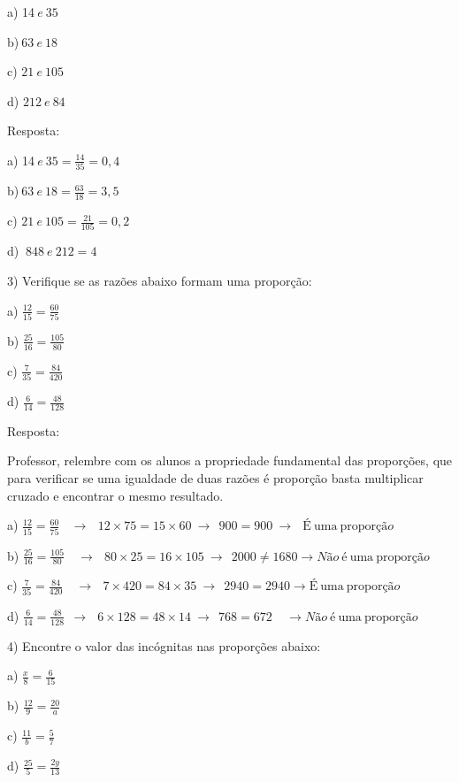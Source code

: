 a) 14\(\ e\ 35\)

b)\(\ 63\ e\ 18\)

c) \(21\ e\ 105\)

d) \(212\ e\ 84\)

Resposta:

a) 14\(\ e\ 35 = \frac{14}{35} = 0,4\)

b)\(\ 63\ e\ 18 = \frac{63}{18} = 3,5\)

c) \(21\ e\ 105 = \frac{21}{105} = 0,2\)

d) \(\ 848\ e\ 212 = 4\)

3) Verifique se as razões abaixo formam uma proporção:

a) \(\frac{12}{15} = \frac{60}{75}\)

b) \(\frac{25}{16} = \frac{105}{80}\)

c) \(\frac{7}{35} = \frac{84}{420}\)

d) \(\frac{6}{14} = \frac{48}{128}\)

Resposta:

Professor, relembre com os alunos a propriedade fundamental das
proporções, que para verificar se uma igualdade de duas razões é
proporção basta multiplicar cruzado e encontrar o mesmo resultado.

a)
\(\frac{12}{15} = \frac{60}{75}\ \ \ \  \rightarrow \ \ \ 12 \times 75 = 15 \times 60\  \rightarrow \ \ 900 = 900\  \rightarrow \ \ \ É\ \text{uma}\ \text{pr}\text{opor}ção\text{\ \ \ }\)

b) \(\frac{25}{16} = \frac{105}{80}\)
\(\ \ \  \rightarrow \ \ \ 80 \times 25 = 16 \times 105\  \rightarrow \ \ 2000 \neq 1680 \rightarrow Não\ é\ \text{uma}\ \text{propor}ção\text{\ \ \ }\)

c) \(\frac{7}{35} = \frac{84}{420}\)
\(\ \ \  \rightarrow \ \ \ 7 \times 420 = 84 \times 35\  \rightarrow \ \ 2940 = 2940 \rightarrow É\ \text{uma}\ \text{propor}ção\text{\ \ \ }\)

d)
\(\frac{6}{14} = \frac{48}{128}\ \  \rightarrow \ \ \ 6 \times 128 = 48 \times 14\  \rightarrow \ \ 768 = 672\ \ \ \ \  \rightarrow Não\ é\ \text{uma}\ \text{propor}ção\text{\ \ \ }\)

4) Encontre o valor das incógnitas nas proporções abaixo:

a) \(\frac{x}{8} = \frac{6}{15}\)

b) \(\frac{12}{9} = \frac{20}{a}\)

c) \(\frac{11}{b} = \frac{5}{7}\)

d) \(\frac{25}{5} = \frac{2y}{13}\)

